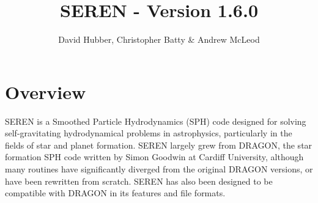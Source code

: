 \documentclass[a4paper]{article}
\begin{document}
\title{SEREN - Version 1.6.0}
\author{David Hubber, Christopher Batty \& Andrew McLeod}

\maketitle

\tableofcontents

\newpage

\section{Overview}
SEREN is a Smoothed Particle Hydrodynamics (SPH) code designed for solving self-gravitating hydrodynamical problems in astrophysics, particularly in the fields of star and planet formation.  SEREN largely grew from DRAGON, the star formation SPH code written by Simon Goodwin at Cardiff University, although many routines have significantly diverged from the original DRAGON versions, or have been rewritten from scratch.  SEREN has also been designed to be compatible with DRAGON in its features and file formats. \newline
\end{document}
